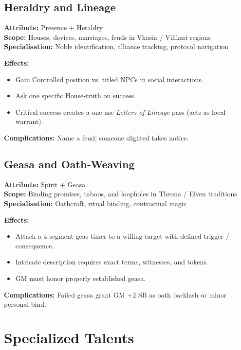 \subsection{Heraldry and Lineage}\label{subsec:heraldry}

\textbf{Attribute:} Presence + Heraldry\\
\textbf{Scope:} Houses, devices, marriages, feuds in Vhasia / Vilikari regions\\
\textbf{Specialisation:} Noble identification, alliance tracking, protocol navigation

\textbf{Effects:}
\begin{itemize}
    \item Gain Controlled position vs. titled NPCs in social interactions.
    \item Ask one specific House‑truth on success.
    \item Critical success creates a one‑use \emph{Letters of Lineage} pass (acts as local warrant).
\end{itemize}
\textbf{Complications:} Name a feud; someone slighted takes notice.

\subsection{Geasa and Oath‑Weaving}\label{subsec:geasa}

\textbf{Attribute:} Spirit + Geasa\\
\textbf{Scope:} Binding promises, taboos, and loopholes in Theona / Elven traditions\\
\textbf{Specialisation:} Oathcraft, ritual binding, contractual magic

\textbf{Effects:}
\begin{itemize}
    \item Attach a 4‑segment geas timer to a willing target with defined trigger / consequence.
    \item Intricate description requires exact terms, witnesses, and tokens.
    \item GM must honor properly established geasa.
\end{itemize}
\textbf{Complications:} Failed geasa grant GM +2 SB as oath backlash or minor personal bind.

\section{Specialized Talents}\label{sec:specialised_talents}

